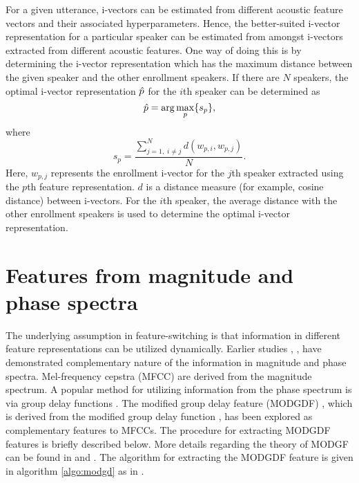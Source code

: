 \documentclass[preprint,12pt,5p]{elsarticle}
\begin{document}
For a given utterance, i-vectors can be estimated from different acoustic
feature vectors and their associated hyperparameters. Hence, the
better-suited i-vector representation for a particular speaker can be estimated
from amongst i-vectors extracted from different acoustic features. One way of
doing this is by determining the i-vector representation which has the maximum
distance between the given speaker and the other enrollment speakers. If there
are $N$ speakers, the optimal i-vector representation $\Hat{p}$ 
for the $i$th speaker can be determined as
\begin{equation}
\Hat{p} = \arg\max_p \{s_p\},
\label{eq:opt_ivec}
\end{equation}
where 
\begin{equation}
s_p = \frac{\displaystyle \sum_{j=1, \; i \neq j}^N d(w_{p,i},w_{p,j})}{N}.
\label{eq:sp}
\end{equation}
Here, $w_{p,j}$ represents the enrollment i-vector for the $j$th speaker
extracted using the $p$th feature representation. $d$ is a distance measure (for
example, cosine distance) between i-vectors. For the $i$th speaker, the average
distance with the other enrollment speakers is used to determine the optimal
i-vector representation. 

\section{Features from magnitude and phase spectra}
\label{sec:featExt}

The underlying assumption in feature-switching is that information in different
feature representations can be utilized dynamically. Earlier studies
\cite{complement1}, \cite{complement2}, \cite{complement3} have demonstrated
complementary nature of the information in magnitude and phase spectra. Mel-frequency cepstra
(MFCC) are derived from the magnitude spectrum. A popular method for utilizing
information from the phase spectrum is via group delay functions
\cite{group_delay}. The modified group delay feature (MODGDF) \cite{modgd_feat},
which is derived from the modified group delay function \cite{modgd_func}, has
been explored as complementary features to MFCCs. The procedure for extracting
MODGDF features is briefly described below. More details regarding the theory
of MODGF can be found in \cite{modgd_feat} and \cite{modgd_func}. The algorithm
for extracting the MODGDF feature is given in algorithm \ref{algo:modgd} as 
in \cite{hegdeModgdf}.
\end{document}
